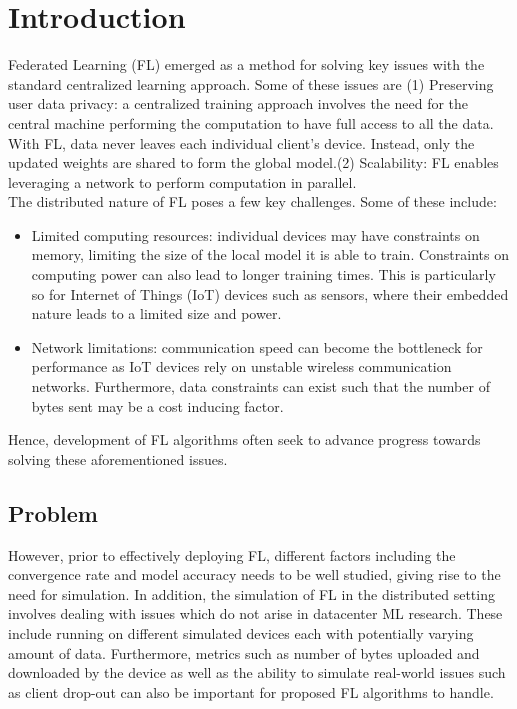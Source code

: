 \documentclass[12pt]{article}
\begin{document}
\section{Introduction}
Federated Learning (FL) emerged as a method for solving key issues with the standard centralized learning
approach. Some of these issues are (1) Preserving user data privacy: a centralized training approach involves the need for the central
machine performing the computation to have full access to all the data. With FL, data never
leaves each individual client's device. Instead, only the updated weights are shared to form the
global model.(2) Scalability: FL enables leveraging a network to perform computation in parallel.\\
The distributed nature of FL poses a few key challenges. Some of these include:
\begin{itemize}
  \item Limited computing resources: individual devices may have constraints on memory, limiting the
    size of the local model it is able to train. Constraints on computing power can also lead to
    longer training times. This is particularly so for Internet of Things (IoT) devices such as
    sensors, where their embedded nature leads to a limited size and power.
  \item Network limitations: communication speed can become the bottleneck for performance as IoT
    devices rely on unstable wireless communication networks. Furthermore, data constraints can
    exist such that the number of bytes sent may be a cost inducing factor.
\end{itemize}

Hence, development of FL algorithms often seek to advance progress towards solving these
aforementioned issues.

\subsection{Problem}
However, prior to effectively deploying FL, different factors including the convergence rate and
model accuracy needs to be well studied, giving rise to the need for simulation. In addition, the
simulation of FL in the distributed setting involves dealing with
issues which do not arise in datacenter ML research. These include running on different simulated
devices each with potentially varying amount of data. Furthermore, metrics such as number of bytes uploaded and
downloaded by the device as well as the ability to simulate real-world issues such as client
drop-out can also be important for proposed FL algorithms to handle.
\end{document}
